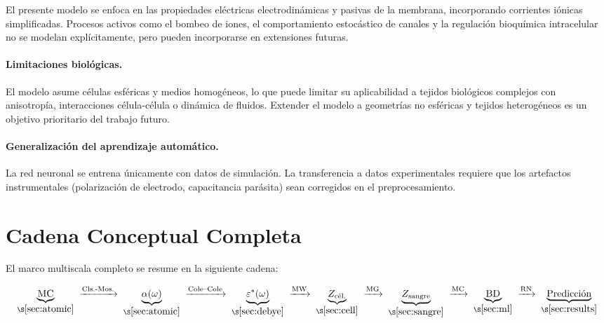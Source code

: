 \documentclass[12pt]{article}
\begin{document}
El presente modelo se enfoca en las propiedades el\'ectricas electrodin\'amicas y pasivas de la
membrana, incorporando corrientes i\'onicas simplificadas. Procesos activos como el bombeo de
iones, el comportamiento estoc\'astico de canales y la regulaci\'on bioqu\'imica intracelular no
se modelan expl\'icitamente, pero pueden incorporarse en extensiones futuras.

\paragraph{Limitaciones biol\'ogicas.}

El modelo asume c\'elulas esf\'ericas y medios homog\'eneos, lo que puede limitar su aplicabilidad
a tejidos biol\'ogicos complejos con anisotrop\'ia, interacciones c\'elula-c\'elula o din\'amica de
fluidos. Extender el modelo a geometr\'ias no esf\'ericas y tejidos heterog\'eneos es un objetivo
prioritario del trabajo futuro.
\paragraph{Generalizaci\'on del aprendizaje autom\'atico.}

La red neuronal se entrena \'unicamente con datos de simulaci\'on. La transferencia a datos
experimentales requiere que los artefactos instrumentales (polarizaci\'on de electrodo,
capacitancia par\'asita) sean corregidos en el preprocesamiento.


\section{Cadena Conceptual Completa}

\label{sec:chain}


El marco multiscala completo se resume en la siguiente cadena:

\begin{equation}
\underbrace{\text{MC}}_{\S\ref{sec:atomic}}
\;\xrightarrow{\text{Cls.-Mos.}}\;
\underbrace{\alpha(\omega)}_{\S\ref{sec:atomic}}
\;\xrightarrow{\text{Cole--Cole}}\;
\underbrace{\varepsilon^*(\omega)}_{\S\ref{sec:debye}}
\;\xrightarrow{\text{MW}}\;
\underbrace{Z_{\text{c\'el.}}}_{\S\ref{sec:cell}}
\;\xrightarrow{\text{MG}}\;
\underbrace{Z_{\text{sangre}}}_{\S\ref{sec:sangre}}
\;\xrightarrow{\text{MC}}\;
\underbrace{\text{BD}}_{\S\ref{sec:ml}}
\;\xrightarrow{\text{RN}}\;
\underbrace{\text{Predicci\'on}}_{\S\ref{sec:results}}
\end{equation}
\end{document}
